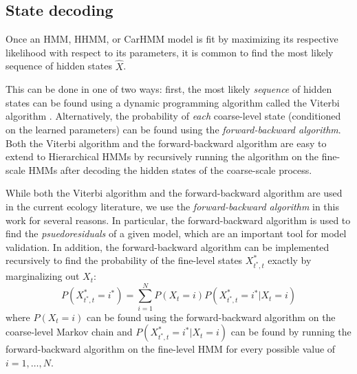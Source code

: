\subsection{State decoding}

Once an HMM, HHMM, or CarHMM model is fit by maximizing its respective likelihood with respect to its parameters, it is common to find the most likely sequence of hidden states $\hat X$. 

This can be done in one of two ways: first, the most likely \textit{sequence} of  hidden states can be found using a dynamic programming algorithm called the Viterbi algorithm \cite{Viterbi:1967}. Alternatively, the probability of \textit{each} coarse-level state (conditioned on the learned parameters) can be found using the \textit{forward-backward algorithm}. Both the Viterbi algorithm and the forward-backward algorithm are easy to extend to Hierarchical HMMs by recursively running the algorithm on the fine-scale HMMs after decoding the hidden states of the coarse-scale process.

While both the Viterbi algorithm and the forward-backward algorithm are used in the current ecology literature, we use the \textit{forward-backward algorithm} in this work for several reasons. In particular, the forward-backward algorithm is used to find the \textit{psuedoresiduals} of a given model, which are an important tool for model validation. In addition, the forward-backward algorithm can be implemented recursively to find the probability of the fine-level states $X^*_{t^*,t}$ exactly by marginalizing out $X_t$:
%
$$P(X^*_{t^*,t} = i^*) = \sum_{i=1}^N P(X_t = i)P(X^*_{t^*,t} = i^* | X_t = i)$$
%
where $P(X_t = i)$ can be found using the forward-backward algorithm on the coarse-level Markov chain and $P(X^*_{t^*,t} = i^* | X_t = i)$ can be found by running the forward-backward algorithm on the fine-level HMM for every possible value of $i = 1, \ldots, N$.